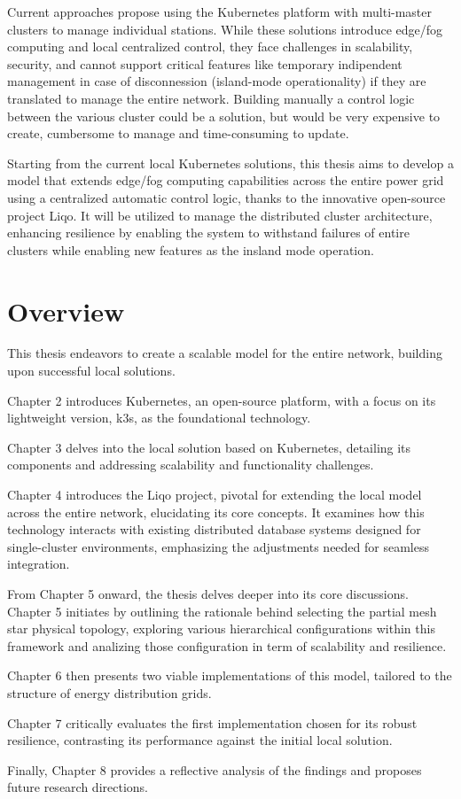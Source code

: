 Current approaches propose using the Kubernetes platform with multi-master clusters to manage individual stations. While these solutions introduce edge/fog computing and local centralized control, they face challenges in scalability, security, and cannot support critical features like temporary indipendent management in case of disconnession (island-mode operationality) if they are translated to manage the entire network. Building manually a control logic between the various cluster could be a solution, but would be very expensive to create, cumbersome to manage and time-consuming to update.

Starting from the current local Kubernetes solutions, this thesis aims to develop a model that extends edge/fog computing capabilities across the entire power grid using a centralized automatic control logic, thanks to the innovative open-source project Liqo. It will be utilized to manage the distributed cluster architecture, enhancing resilience by enabling the system to withstand failures of entire clusters while enabling new features as the insland mode operation. 

\section{Overview}
This thesis endeavors to create a scalable model for the entire network, building upon successful local solutions.

\noindent Chapter 2 introduces Kubernetes, an open-source platform, with a focus on its lightweight version, k3s, as the foundational technology. 

\noindent Chapter 3 delves into the local solution based on Kubernetes, detailing its components and addressing scalability and functionality challenges.

\noindent Chapter 4 introduces the Liqo project, pivotal for extending the local model across the entire network, elucidating its core concepts. It examines how this technology interacts with existing distributed database systems designed for single-cluster environments, emphasizing the adjustments needed for seamless integration.

\noindent From Chapter 5 onward, the thesis delves deeper into its core discussions. Chapter 5 initiates by outlining the rationale behind selecting the partial mesh star physical topology, exploring various hierarchical configurations within this framework and analizing those configuration in term of scalability and resilience. 

\noindent Chapter 6 then presents two viable implementations of this model, tailored to the structure of energy distribution grids.

\noindent Chapter 7 critically evaluates the first implementation chosen for its robust resilience, contrasting its performance against the initial local solution. 

\noindent Finally, Chapter 8 provides a reflective analysis of the findings and proposes future research directions.








